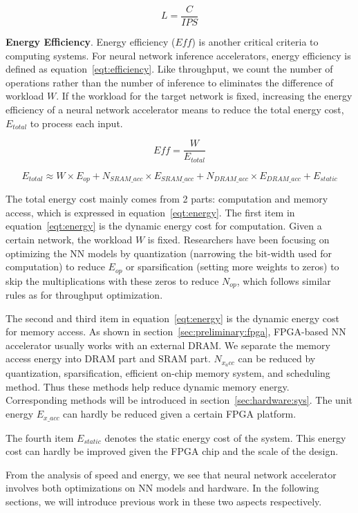 \begin{equation}\label{eqt:latency}
    L = \frac{C}{IPS}
\end{equation}

\textbf{Energy Efficiency}. Energy efficiency ($Eff$) is another critical criteria to computing systems. For neural network inference accelerators, energy efficiency is defined as equation~\ref{eqt:efficiency}. Like throughput, we count the number of operations rather than the number of inference to eliminates the difference of workload $W$. If the workload for the target network is fixed, increasing the energy efficiency of a neural network accelerator means to reduce the total energy cost, $E_{total}$ to process each input. 

\begin{equation}\label{eqt:efficiency}
    Eff = \frac{W}{E_{total}}
\end{equation}
    
\begin{equation}\label{eqt:energy}
    E_{total} \approx W\times E_{op} + N_{SRAM\_acc}\times E_{SRAM\_acc} + N_{DRAM\_acc}\times E_{DRAM\_acc} + E_{static}
\end{equation}

The total energy cost mainly comes from 2 parts: computation and memory access, which is expressed in equation~\ref{eqt:energy}. The first item in equation~\ref{eqt:energy} is the dynamic energy cost for computation. Given a certain network, the workload $W$ is fixed. Researchers have been focusing on optimizing the NN models by quantization (narrowing the bit-width used for computation) to reduce $E_{op}$ or sparsification (setting more weights to zeros) to skip the multiplications with these zeros to reduce $N_{op}$, which follows similar rules as for throughput optimization. 

The second and third item in equation~\ref{eqt:energy} is the dynamic energy cost for memory access. As shown in section~\ref{sec:preliminary:fpga}, FPGA-based NN accelerator usually works with an external DRAM. We separate the memory access energy into DRAM part and SRAM part. $N_{x_acc}$ can be reduced by quantization, sparsification, efficient on-chip memory system, and scheduling method. Thus these methods help reduce dynamic memory energy. Corresponding methods will be introduced in section~\ref{sec:hardware:sys}. The unit energy $E_{x\_acc}$ can hardly be reduced given a certain FPGA platform.

The fourth item $E_{static}$ denotes the static energy cost of the system. This energy cost can hardly be improved given the FPGA chip and the scale of the design.

From the analysis of speed and energy, we see that neural network accelerator involves both optimizations on NN models and hardware. In the following sections, we will introduce previous work in these two aspects respectively.
